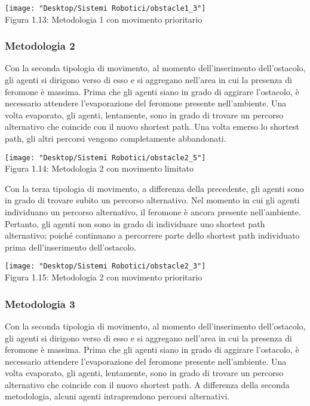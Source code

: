 \documentclass[12pt,a4paper,openright,twoside]{report}
\begin{document}
\begin{center}  
	\texttt{[image: "Desktop/Sistemi Robotici/obstacle1\_3"]}
	\\Figura 1.13: Metodologia 1 con movimento prioritario
\end{center}

\subsubsection{Metodologia 2}

Con la seconda tipologia di movimento, al momento dell'inserimento dell'ostacolo, gli agenti si dirigono verso di esso e si aggregano nell'area in cui la presenza di feromone è massima. Prima che gli agenti siano in grado di aggirare l'ostacolo, è necessario attendere l'evaporazione del feromone presente nell'ambiente. Una volta evaporato, gli agenti, lentamente, sono in grado di trovare un percorso alternativo che coincide con il nuovo shortest path. Una volta emerso lo shortest path, gli altri percorsi vengono completamente abbandonati.\\

\begin{center}  
	\texttt{[image: "Desktop/Sistemi Robotici/obstacle2\_5"]}
	\\Figura 1.14: Metodologia 2 con movimento limitato
\end{center}

Con la terza tipologia di movimento, a differenza della precedente, gli agenti sono in grado di trovare subito un percorso alternativo. Nel momento in cui gli agenti individuano un percorso alternativo, il feromone è ancora presente nell'ambiente. Pertanto, gli agenti non sono in grado di individuare uno shortest path alternativo; poiché continuano a percorrere parte dello shortest path individuato prima dell'inserimento dell'ostacolo.%

\begin{center}  
	\texttt{[image: "Desktop/Sistemi Robotici/obstacle2\_3"]}
	\\Figura 1.15: Metodologia 2 con movimento prioritario
\end{center}

\subsubsection{Metodologia 3}
Con la seconda tipologia di movimento, al momento dell'inserimento dell'ostacolo, gli agenti si dirigono verso di esso e si aggregano nell'area in cui la presenza di feromone è massima. Prima che gli agenti siano in grado di aggirare l'ostacolo, è necessario attendere l'evaporazione del feromone presente nell'ambiente. Una volta evaporato, gli agenti, lentamente, sono in grado di trovare un percorso alternativo che coincide con il nuovo shortest path. A differenza della seconda metodologia, alcuni agenti intraprendono percorsi alternativi.\\
\end{document}
